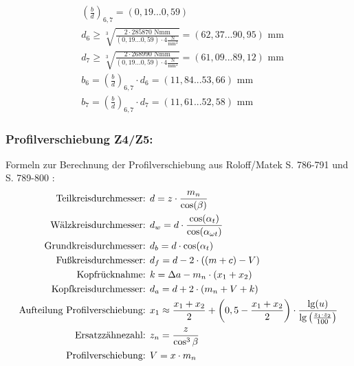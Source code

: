\begin{itemize}
\begin{align*}
	&\left(\frac{b}{d} \right) _{6,7}=  (0,19...0,59) \\
	&d_6 \ge \sqrt[3]{\frac{2 \cdot 285870 \text{ Nmm}}{(0,19...0,59) \cdot  4 \frac{\text{N}}{\text{mm}^2}}}= (62,37...90,95) \text{ mm}\\
	&d_7 \ge \sqrt[3]{\frac{2 \cdot 268990 \text{ Nmm}}{(0,19...0,59) \cdot  4 \frac{\text{N}}{\text{mm}^2}}}= (61,09...89,12) \text{ mm}  \\
	&b_6= \left(\frac{b}{d} \right) _{6,7}  \cdot d_6 = (11,84...53,66) \text{ mm}  \\
	&b_7= \left(\frac{b}{d} \right) _{6,7}  \cdot d_7 = (11,61...52,58) \text{ mm}  
\end{align*}
\end{itemize}
\subsubsection{Profilverschiebung Z4/Z5:}
Formeln zur Berechnung der Profilverschiebung aus Roloff/Matek S. 786-791 und S. 789-800 :
\begin{align*}
\text{Teilkreisdurchmesser: }&d = z \cdot \frac{m_n}{\cos(\beta)} \\
\text{Wälzkreisdurchmesser: }&d_w = d \cdot \frac{\cos(\alpha_t)}{\cos(\alpha_{\omega t})} \\
\text{Grundkreisdurchmesser: }&d_b = d \cdot \cos(\alpha_t) \\
\text{Fußkreisdurchmesser: }&d_f = d -2 \cdot ((m+c)-V)\\
\text{Kopfrücknahme: }&k = \Delta a -m_n \cdot (x_1+x_2)\\
\text{Kopfkreisdurchmesser: }&d_a = d +2 \cdot (m_n+V +k)\\
\text{Aufteilung Profilverschiebung: }& x_1 \approx \frac{x_1 + x_2}{2} + \left( 0,5 - \frac{x_1+x_2}{2} \right) \cdot \frac{\lg(u)}{\lg\left( \frac{z_1 \cdot z_2}{100} \right)} \\
\text{Ersatzzähnezahl: }& z_n = \frac{z}{\cos^3\beta} \\
\text{Profilverschiebung: }& V = x \cdot m_n 
\end{align*}

